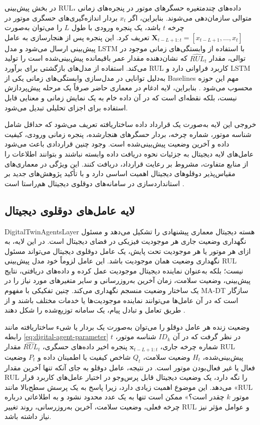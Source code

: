 در بخش پیش‌بینی \gls{RUL}، داده‌های چندمتغیره حسگرهای موتور در پنجره‌های زمانی متوالی سازمان‌دهی می‌شوند. بنابراین، اگر $x_t$ بردار اندازه‌گیری‌های حسگری موتور در چرخه $t$ باشد، یک پنجره ورودی با طول $L$ را می‌توان به‌صورت $\mathbf{X}_{t-L+1:t}=[x_{t-L+1},\ldots,x_t]$ تعریف کرد. این پنجره پس از هنجارسازی به عامل پیش‌بینی ارسال می‌شود و مدل LSTM با استفاده از وابستگی‌های زمانی موجود در توالی، مقدار $\widehat{RUL}_t$ که نشان‌دهنده مقدار عمر باقیمانده پیش‌بینی‌شده است را تولید می‌کند. استفاده از مدل‌های بازگشتی برای برآورد \gls{RUL} کاربرد فراوانی دارد و LSTM به‌دلیل توانایی در مدل‌سازی وابستگی‌های زمانی یکی از \glspl{Baseline} مهم این حوزه محسوب می‌شود \cite{heimes2008recurrent,park2026hybriddt}. بنابراین، لایه ادغام در معماری حاضر صرفاً یک مرحله پیش‌پردازش نیست، بلکه نقطه‌ای است که در آن داده خام به یک نمایش زمانی و معنایی قابل استفاده برای اجزای تحلیلی تبدیل می‌شود.

خروجی این لایه به‌صورت یک قرارداد داده ساختاریافته تعریف می‌شود که حداقل شامل شناسه موتور، شماره چرخه، بردار حسگرهای هنجارشده، پنجره زمانی ورودی، کیفیت داده و آخرین وضعیت پیش‌بینی‌شده است. وجود چنین قراردادی باعث می‌شود عامل‌های لایه دیجیتال به جزئیات نحوه دریافت داده وابسته نباشند و بتوانند اطلاعات را از منابع متفاوت، مشروط بر رعایت قرارداد، دریافت کنند. این ویژگی در معماری‌های مقیاس‌پذیر دوقلوهای دیجیتال اهمیت اساسی دارد و با تأکید پژوهش‌های جدید بر استانداردسازی در سامانه‌های دوقلوی دیجیتال هم‌راستا است \cite{park2026hybriddt,fu2026genaidt}.


\subsection{لایه عامل‌های دوقلوی دیجیتال}
\label{sec:layer-dt-agents}

\gls{DigitalTwinAgentsLayer} هسته دیجیتال معماری پیشنهادی را تشکیل می‌دهد و مسئول نگهداری وضعیت جاری هر موجودیت فیزیکی در فضای دیجیتال است. در این لایه، به ازای هر موتور یا هر موجودیت تحت پایش، یک عامل دوقلوی دیجیتال می‌تواند مسئول نگهداری وضعیت همان موجودیت باشد. این عامل لزوماً خود مدل پیش‌بینی \gls{RUL} نیست؛ بلکه به‌عنوان نماینده دیجیتال موجودیت عمل کرده و داده‌های دریافتی، نتایج پیش‌بینی، وضعیت سلامت، زمان آخرین به‌روزرسانی و سایر متغیرهای مورد نیاز را در یک ساختار وضعیت منسجم نگهداری می‌کند. چنین تفکیکی با مفهوم \gls{MA-DT} سازگار است که در آن عامل‌ها می‌توانند نماینده موجودیت‌ها یا خدمات مختلف باشند و از طریق تعامل و تبادل پیام، یک سامانه توزیع‌شده را شکل دهند \cite{pretel2022masdt,lopez2024madtwin,wang2024multiagent}.

وضعیت زنده هر عامل دوقلو را می‌توان به‌صورت یک بردار یا شیء ساختاریافته مانند رابطه \eqref{eq:digital-agent-parameter} در نظر گرفت که در آن $ID_k$ شناسه موتور، $t$ شماره چرخه جاری، $\mathbf{x}_{t-L+1:t}$ پنجره اخیر داده‌های حسگری، $\widehat{RUL}_t$ مقدار \gls{RUL} پیش‌بینی‌شده، $H_t$ وضعیت سلامت، $Q_t$ شاخص کیفیت یا اطمینان داده و $P_t$ وضعیت فعال یا غیر فعال‌بودن موتور است. در نتیجه، عامل دوقلو به جای آنکه تنها آخرین مقدار \gls{RUL} را نگه دارد، یک وضعیت دیجیتال قابل پرس‌وجو در اختیار عامل‌های کاربرد قرار می‌دهد. این موضوع اهمیت زیادی دارد، زیرا پاسخ به یک پرسش سطح‌بالا مانند «\gls{RUL} موتور $k$ چقدر است؟» ممکن است تنها به یک عدد محدود نشود و به اطلاعاتی درباره چرخه فعلی، وضعیت سلامت، آخرین به‌روزرسانی، روند تغییر \gls{RUL} و عوامل مؤثر نیز نیاز داشته باشد.

